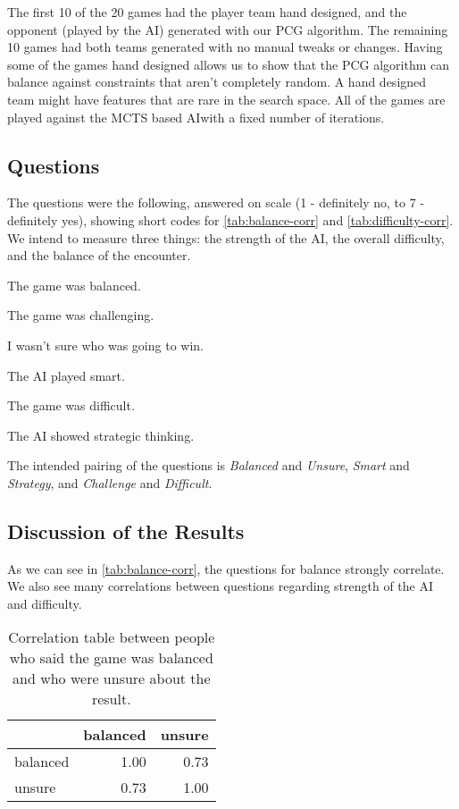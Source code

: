The first 10 of the 20 games had the player team hand designed, and the
opponent (played by the AI) generated with our PCG algorithm. The remaining 10
games had both teams generated with no manual tweaks or changes. Having some of
the games hand designed allows us to show that the PCG algorithm can balance
against constraints that aren't completely random. A hand designed team might
have features that are rare in the search space. All of the games are played
against the MCTS based AI\@ with a fixed number of iterations.

\subsection{Questions}

The questions were the following, answered on scale (1 - definitely no, to 7 - definitely yes), showing short codes for \autoref{tab:balance-corr} and \autoref{tab:difficulty-corr}. We intend to measure three things: the strength of the AI, the overall difficulty, and the balance of the encounter.

\begin{description}[]
	\item[Balanced:] The game was balanced.
	\item[Challenge:] The game was challenging.
	\item[Unsure:] I wasn't sure who was going to win.
	\item[Smart:] The AI played smart.
	\item[Difficult:] The game was difficult.
	\item[Strategy:] The AI showed strategic thinking.
\end{description}

The intended pairing of the questions is \emph{Balanced} and \emph{Unsure}, \emph{Smart} and \emph{Strategy}, and \emph{Challenge} and \emph{Difficult}.

\subsection{Discussion of the Results}

As we can see in \autoref{tab:balance-corr}, the questions for balance strongly correlate. We also see many correlations between questions regarding strength of the AI and difficulty.

\begin{table}[h]
	\centering
	\begin{tabular}{lrr}
		\toprule
		{} &  balanced &  unsure \\
		\midrule
		balanced &      1.00 &    \cellcolor{blue!25}0.73 \\
		unsure   &      \cellcolor{blue!25}0.73 &    1.00 \\
		\bottomrule
	\end{tabular}
	\caption{Correlation table between people who said the game was balanced and who were unsure about the result.}	
	\label{tab:balance-corr}
\end{table}

